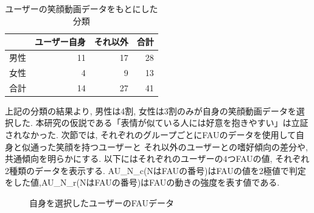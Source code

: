 \begin{table}[htb]
  \caption{ユーザーの笑顔動画データをもとにした分類}
  \label{tb:agegenderchart}
  \begin{center}
  \begin{tabular}{|l|r|r||r|} \hline
    　&ユーザー自身&それ以外&合計 \\ \hline \hline
    男性&11&17&28 \\
    女性&4&9&13 \\ \hline \hline
    合計&14&27&41 \\ \hline
  \end{tabular}
  \end{center}
\end{table}

上記の分類の結果より, 男性は4割, 女性は3割のみが自身の笑顔動画データを選択した.
本研究の仮説である「表情が似ている人には好意を抱きやすい」は立証されなかった.
次節では, それぞれのグループごとにFAUのデータを使用して自身と似通った笑顔を持つユーザーと
それ以外のユーザーとの嗜好傾向の差分や, 共通傾向を明らかにする.
以下にはそれぞれのユーザーの4つFAUの値, それぞれ2種類のデータを表示する.
AU\_N\_c(NはFAUの番号)はFAUの値を2極値で判定をした値,AU\_N\_r(NはFAUの番号)はFAUの動きの強度を表す値である.

\begin{figure}[htbp]
    \begin{center}
    \end{center}
    \caption{自身を選択したユーザーのFAUデータ}
    \label{fig:choice_myself_fau_for_paper}
\end{figure}

